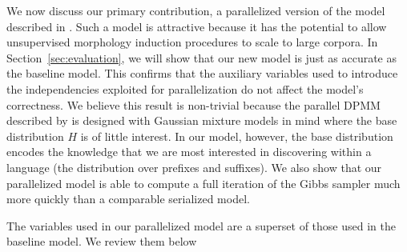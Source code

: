 We now discuss our primary contribution, a parallelized version of the
model described in \cite{goldwater2011}. Such a model is attractive
because it has the potential to allow unsupervised morphology
induction procedures to scale to large corpora. In
Section~\ref{sec:evaluation}, we will show that our new model is just
as accurate as the baseline model. This confirms that the auxiliary
variables used to introduce the independencies exploited for
parallelization do not affect the model's correctness. We believe this
result is non-trivial because the parallel DPMM described by
\cite{williamson2013} is designed with Gaussian mixture models in mind
where the base distribution $H$ is of little interest. In our model,
however, the base distribution encodes the knowledge that we are most
interested in discovering within a language (the distribution over
prefixes and suffixes). We also show that our parallelized model is
able to compute a full iteration of the Gibbs sampler much more
quickly than a comparable serialized model.

The variables used in our parallelized model are a superset of those
used in the baseline model. We review them below


